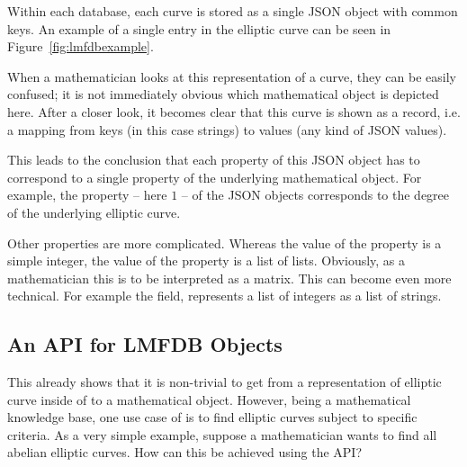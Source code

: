 Within each database, each curve is stored as a single JSON object with common keys. 
An example of a single entry in the elliptic curve can be seen in Figure~\ref{fig:lmfdbexample}.

When a mathematician looks at this representation of a curve, they can be easily confused; it is not immediately obvious which mathematical object is depicted here. 
After a closer look, it becomes clear that this curve is shown as a record, i.e. a mapping from keys (in this case strings) to values (any kind of JSON values). 

This leads to the conclusion that each property of this JSON object has to correspond to a single property of the underlying mathematical object. 
For example, the  property -- here $1$ -- of the JSON objects corresponds to the degree of the underlying elliptic curve. 

Other properties are more complicated. 
Whereas the value of the  property is a simple integer, the value of the  property is a list of lists. 
Obviously, as a mathematician this is to be interpreted as a matrix. 
This can become even more technical. 
For example the  field, \lmfdb represents a list of integers as a list of strings.

\subsection{An API for LMFDB Objects}\label{sec:sota:api}

This already shows that it is non-trivial to get from a representation of elliptic curve inside of \lmfdb to a mathematical object. 
However, being a mathematical knowledge base, one use case of \lmfdb is to find elliptic curves subject to specific criteria. 
As a very simple example, suppose a mathematician wants to find all abelian elliptic curves. 
How can this be achieved using the \lmfdb API?

